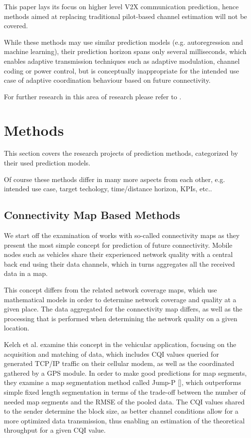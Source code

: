 \documentclass[conference]{IEEEtran}
\begin{document}
This paper lays its focus on higher level V2X communication prediction, hence methods aimed at replacing traditional pilot-based channel estimation will not be covered.

While these methods may use similar prediction models (e.g. autoregression and machine learning), their prediction horizon spans only several milliseconds, which enables adaptive transmission techniques such as adaptive modulation, channel coding or power control, but is conceptually inappropriate for the intended use case of adaptive coordination behaviour based on future connectivity.

For further research in this area of research please refer to \cite{semmelrodtInvestigationDifferentFading2003,duel-hallenFadingChannelPrediction2007,wongJointChannelEstimation2005,wongWLC435LowComplexityAdaptive2006,vaughanShorttermMobileChannel2000}.


\section{Methods}
This section covers the research projects of prediction methods, categorized by their used prediction models. 

Of course these methods differ in many more aspects from each other, e.g. intended use case, target techology, time/distance horizon, KPIs, etc..


\subsection{Connectivity Map Based Methods}
We start off the examination of works with so-called connectivity maps as they present the most simple concept for prediction of future connectivity. Mobile nodes such as vehicles share their experienced network quality with a central back end using their data channels, which in turns aggregates all the received data in a map.

This concept differs from the related network coverage maps, which use mathematical models in order to determine network coverage and quality at a given place.
The data aggregated for the connectivity map differs, as well as the processing that is performed when determining the network quality on a given location.

Kelch et al. \cite{kelchCQIMapsOptimized2013} examine this concept in the vehicular application, focusing on the acquisition and matching of data, which includes CQI values queried for generated TCP/IP traffic on their cellular modem, as well as the coordinated gathered by a GPS module. In order to make good predictions for map segments, they examine a map segmentation method called Jump-P [], which outperforms simple fixed length segmentation in terms of the trade-off between the number of needed map segments and the RMSE of the pooled data. The CQI values shared to the sender determine the block size, as better channel conditions allow for a more optimized data transmission, thus enabling an estimation of the theoretical throughput for a given CQI value.
\end{document}
